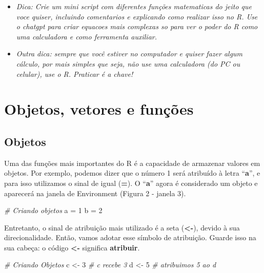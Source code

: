 \documentclass[
]{book}
\newenvironment{Shaded}{\begin{snugshade}}{\end{snugshade}}
\newcommand{\CommentTok}[1]{\textcolor[rgb]{0.56,0.35,0.01}{\textit{#1}}}
\newcommand{\DecValTok}[1]{\textcolor[rgb]{0.00,0.00,0.81}{#1}}
\newcommand{\NormalTok}[1]{#1}
\newcommand{\OtherTok}[1]{\textcolor[rgb]{0.56,0.35,0.01}{#1}}
\begin{document}
\begin{itemize}
\item
  \emph{Dica: Crie um mini script com diferentes funções matematicas do jeito que voce quiser, incluindo comentarios e explicando como realizar isso no R. Use o chatgpt para criar equacoes mais complexas so para ver o poder do R como uma calculadora e como ferramenta auxiliar.}
\item
  \emph{Outra dica: sempre que você estiver no computador e quiser fazer algum cálculo, por mais simples que seja, não use uma calculadora (do PC ou celular), use o R. Praticar é a chave!}
\end{itemize}

\hypertarget{objetos-vetores-e-funuxe7uxf5es}{%
\section{Objetos, vetores e funções}\label{objetos-vetores-e-funuxe7uxf5es}}

\hypertarget{objetos}{%
\subsection{Objetos}\label{objetos}}

Uma das funções mais importantes do R é a capacidade de armazenar valores em objetos. Por exemplo, podemos dizer que o número 1 será atribuído à letra ``\textbf{a}'', e para isso utilizamos o sinal de igual (\textbf{=}). O ``\textbf{a}'' agora é considerado um objeto e aparecerá na janela de Environment (Figura 2 - janela 3).

\begin{Shaded}
\begin{Highlighting}[]
\CommentTok{\# Criando objetos}
\NormalTok{a }\OtherTok{=} \DecValTok{1}  
\NormalTok{b }\OtherTok{=} \DecValTok{2}  
\end{Highlighting}
\end{Shaded}

Entretanto, o sinal de atribuição mais utilizado é a seta (\textbf{\textless-}), devido à sua direcionalidade. Então, vamos adotar esse símbolo de atribuição. Guarde isso na sua cabeça: o código \textbf{\textless-} significa \textbf{atribuir}.

\begin{Shaded}
\begin{Highlighting}[]
\CommentTok{\# Criando Objetos}
\NormalTok{c }\OtherTok{\textless{}{-}} \DecValTok{3} \CommentTok{\# c recebe 3}
\NormalTok{d }\OtherTok{\textless{}{-}} \DecValTok{5} \CommentTok{\# atribuimos 5 ao d}
\end{Highlighting}
\end{Shaded}
\end{document}
